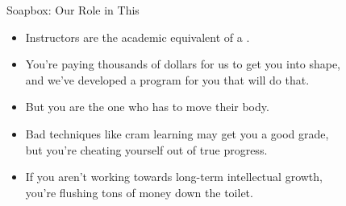\documentclass[professionalfonts, xcolor={usenames,svgnames,x11names,table}]{beamer}
\begin{document}
\begin{frame}{Soapbox: Our Role in This}
    \begin{itemize}
        \item Instructors are the academic equivalent of a .
        \item You're paying thousands of dollars for us to get you into shape,\\ and we've developed a program for you that will do that.
        \item But you are the one who has to move their body.
        \item Bad techniques like cram learning may get you a good grade,\\
              but you're cheating yourself out of true progress.
        \item If you aren't working towards long-term intellectual growth,\\
            you're flushing tons of money down the toilet.
    \end{itemize}
\end{frame}
\end{document}
